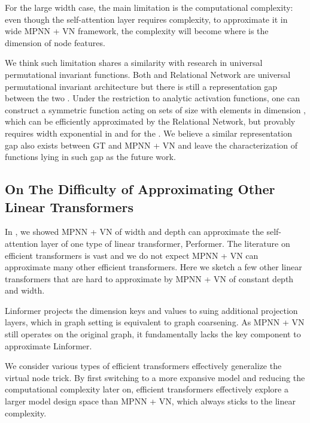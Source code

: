 \documentclass[nohyperref]{article}
\theoremstyle{plain}
\theoremstyle{definition}
\theoremstyle{remark}
\newcommand{\DS}{\text{DeepSets}}
\begin{document}
For the large width case, the main limitation is the computational complexity: even though the self-attention layer requires  complexity, to approximate it in wide MPNN + VN framework, the complexity will become  where  is the dimension of node features.

We think such limitation shares a similarity with research in universal permutational invariant functions. Both \DS{} \citep{zaheer2017deep} and Relational Network \citep{santoro2017simple} are universal permutational invariant architecture but there is still a representation gap between the two \citep{zweig2022exponential}. Under the restriction to analytic activation functions, one can construct a symmetric function acting on sets of size  with elements in dimension , which can be efficiently
approximated by the Relational Network, but provably requires width exponential in  and  for the \DS{}. We believe a similar representation gap also exists between GT and MPNN + VN and leave the characterization of functions lying in such gap as the future work. 

\subsection{On The Difficulty of Approximating Other Linear Transformers}
\label{subsec:ohter-linear-transformer}
In , we showed MPNN + VN of  width and depth can approximate the self-attention layer of one type of linear transformer, Performer. The literature on efficient transformers is vast \cite{tay2020efficient} and we do not expect MPNN + VN can approximate many other efficient transformers. Here we sketch a few other linear transformers that are hard to  approximate by MPNN + VN of constant depth and width. 

Linformer \citep{wang2020linformer} projects the  dimension keys and values to  suing additional projection layers, which in graph setting is equivalent to graph coarsening. As MPNN + VN still operates on the original graph, it fundamentally lacks the key component to approximate Linformer. 



We consider various types of efficient transformers effectively generalize the virtual node trick. By first switching to a more expansive model and reducing the computational complexity later on, efficient transformers effectively explore a larger model design space than MPNN + VN, which always sticks to the linear complexity.  
\end{document}
